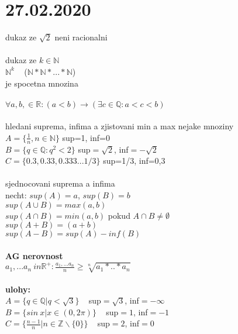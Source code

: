 \documentclass[a4paper]{article}
\begin{document}
\section*{27.02.2020}

dukaz ze $\sqrt{2}$ neni racionalni\\
\\
dukaz ze $k \in \mathbb{N}$\\
$\mathbb{N}^k$ ~ ($\mathbb{N} * \mathbb{N} * ... * \mathbb{N}$)\\
je spocetna mnozina\\
\\
$\forall a,b, \in \mathbb{R}: (a<b) \rightarrow (\exists c \in \mathbb{Q}: a<c<b)$\\
\\
hledani suprema, infima a zjistovani min a max nejake mnoziny\\
$A=\{\frac{1}{n}, n\in\mathbb{N}\}$ sup=1, inf=0\\
$B=\{q \in \mathbb{Q}: q^2 < 2\}$ sup$=\sqrt{2}$, inf$=-\sqrt{2}$\\
$C=\{0.3, 0.33, 0.333 ... 1/3\}$ sup=1/3, inf=0,3\\
\\
sjednocovani suprema a infima\\
necht: $sup(A) = a$, $sup(B) = b$\\
$sup(A \cup B) = max(a,b)$\\
$sup(A \cap B) = min(a,b)$ pokud $A\cap B \neq \emptyset$\\
$sup(A + B) = (a+b)$\\
$sup(A - B) = sup(A) - inf(B)$\\
\\
\textbf{AG nerovnost}\\
$a_1, ... a_n \ in \mathbb{R}^{+}: \frac{a_1, ... a_n}{n} \geq \sqrt[n]{a_1 * .. * a_n}$\\
\\
\textbf{ulohy:}\\
$A=\{q\in\mathbb{Q} | q<\sqrt{3}\}$ ~ sup$=\sqrt{3}$, inf$=-\infty$\\
$B=\{sin~x | x\in(0,2\pi)\}$ ~ sup$=1$, inf$=-1$\\
$C=\{\frac{n-1}{n} | n \in \mathbb{Z} \backslash \{0\} \}$ ~ sup$=2$, inf$=0$\\
\\
\end{document}
